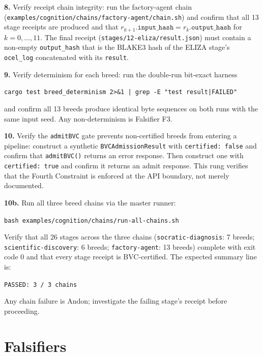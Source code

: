 \medskip
\textbf{8.} Verify receipt chain integrity: run the factory-agent chain
(\texttt{examples/cognition/chains/factory-agent/chain.sh}) and confirm that all 13
stage receipts are produced and that
$r_{k+1}.\texttt{input\_hash} = r_k.\texttt{output\_hash}$ for $k = 0, \ldots, 11$.
The final receipt (\texttt{stages/12-eliza/result.json}) must contain a non-empty
\texttt{output\_hash} that is the BLAKE3 hash of the ELIZA stage's
\texttt{ocel\_log} concatenated with its \texttt{result}.

\medskip
\textbf{9.} Verify determinism for each breed: run the double-run bit-exact harness
\begin{center}
\texttt{cargo test breed\_determinism 2>\&1 | grep -E "test result|FAILED"}
\end{center}
and confirm all 13 breeds produce identical byte sequences on both runs with the
same input seed. Any non-determinism is Falsifier F3.

\medskip
\textbf{10.} Verify the \texttt{admitBVC} gate prevents non-certified breeds from entering
a pipeline: construct a synthetic \texttt{BVCAdmissionResult} with
\texttt{certified: false} and confirm that \texttt{admitBVC()} returns an error
response. Then construct one with \texttt{certified: true} and confirm it returns
an admit response. This rung verifies that the Fourth Constraint is enforced at
the API boundary, not merely documented.

\medskip
\textbf{10b.} Run all three breed chains via the master runner:
\begin{center}
\texttt{bash examples/cognition/chains/run-all-chains.sh}
\end{center}
Verify that all 26 stages across the three chains
(\texttt{socratic-diagnosis}: 7 breeds; \texttt{scientific-discovery}: 6 breeds;
\texttt{factory-agent}: 13 breeds) complete with exit code 0 and that every
stage receipt is BVC-certified. The expected summary line is:
\begin{center}
\texttt{PASSED: 3 / 3 chains}
\end{center}
Any chain failure is Andon; investigate the failing stage's receipt before
proceeding.

\section{Falsifiers}
\label{sec:falsifiers}

